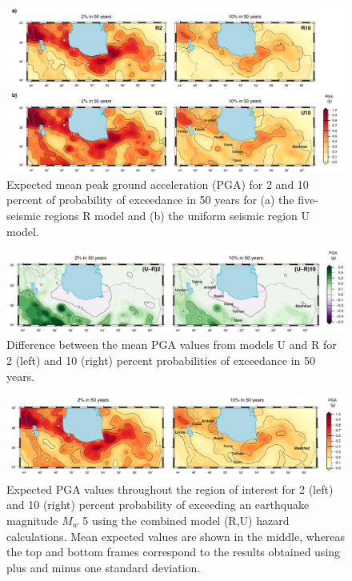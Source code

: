 \begin{figure}[t]
    \centering
    \includegraphics[width=\textwidth]{figures/pdf/figure-08.pdf}
    \caption{Expected mean peak ground acceleration (PGA) for 2 and 10 percent of probability of exceedance in 50 years for (a) the five-seismic regions R model and (b) the uniform seismic region U model.}
    \label{fig:pga}
\end{figure}

\begin{figure}[t]
    \centering
    \includegraphics[width=\textwidth]{figures/pdf/figure-09.pdf}
    \caption{Difference between the mean PGA values from models U and R for 2 (left) and 10 (right) percent probabilities of exceedance in 50 years.}
    \label{fig:pga.diff}
\end{figure}

\begin{figure}[t]
    \centering
    \includegraphics[width=\textwidth]{figures/pdf/figure-12.pdf}
    \caption{Expected PGA values throughout the region of interest for 2 (left) and 10 (right) percent probability of exceeding an earthquake magnitude $M_w$ 5 using the combined model (R,U) hazard calculations. Mean expected values are shown in the middle, whereas the top and bottom frames correspond to the results obtained using plus and minus one standard deviation.}
    \label{fig:pga.ru.std}
\end{figure}

